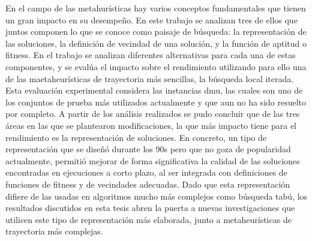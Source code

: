 En el campo de las metahurísticas hay varios conceptos fundamentales que tienen un gran impacto en su desempeño.
%
En este trabajo se analizan tres de ellos que juntos componen lo que se conoce como paisaje de búsqueda: la representación de las soluciones, 
la definición de vecindad de una solución, y la función de aptitud o fitness. 
%
En el trabajo se analizan diferentes alternativas para cada una de estas componentes, y se evalúa el impacto sobre el rendimiento utilizando
para ello una de las maetaheurísticas de trayectoria más sencillas, la búsqueda local iterada.
%
Esta evaluación experimental considera las instancias dmu, las cuales son uno de los conjuntos de prueba más utilizados actualmente y que aun no ha
sido resuelto por completo.
%
A partir de los análisis realizados se pudo concluir que de las tres áreas en las que se plantearon modificaciones, la que más impacto tiene para el
rendimiento es la representación de soluciones.
%
En concreto, un tipo de representación que se diseñó durante los 90s pero que no goza de popularidad actualmente,
permitió mejorar de forma significativa la calidad de las soluciones encontradas en ejecuciones a corto plazo, 
al ser integrada con definiciones de funciones de fitness y de vecindades adecuadas.
%
Dado que esta representación difiere de las usadas en algoritmos mucho más complejos como búsqueda tabú, los resultados discutidos en esta tesis
abren la puerta a nuevas investigaciones que utilicen este tipo de representación más elaborada, junto a metaheurísticas de
trayectoria más complejas.

\let\cleardoublepage\clearpage



